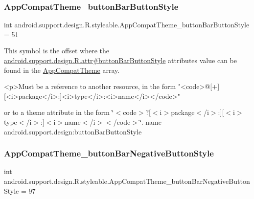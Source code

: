 \subsubsection{\texorpdfstring{App\+Compat\+Theme\+\_\+button\+Bar\+Button\+Style}{AppCompatTheme\_buttonBarButtonStyle}}
{\footnotesize\ttfamily int android.\+support.\+design.\+R.\+styleable.\+App\+Compat\+Theme\+\_\+button\+Bar\+Button\+Style = 51\hspace{0.3cm}{\ttfamily [static]}}

This symbol is the offset where the \hyperlink{classandroid_1_1support_1_1design_1_1R_1_1attr_a209ae9ca1ec9cf4b260524ededf1660c}{android.\+support.\+design.\+R.\+attr\#button\+Bar\+Button\+Style} attribute\textquotesingle{}s value can be found in the \hyperlink{classandroid_1_1support_1_1design_1_1R_1_1styleable_afb351dc8de20cbd4c89abe360373010c}{App\+Compat\+Theme} array.

\begin{DoxyVerb}      <p>Must be a reference to another resource, in the form "<code>@[+][<i>package</i>:]<i>type</i>:<i>name</i></code>"
\end{DoxyVerb}
 or to a theme attribute in the form \char`\"{}$<$code$>$?\mbox{[}$<$i$>$package$<$/i$>$\+:\mbox{]}\mbox{[}$<$i$>$type$<$/i$>$\+:\mbox{]}$<$i$>$name$<$/i$>$$<$/code$>$\char`\"{}.  name android.\+support.\+design\+:button\+Bar\+Button\+Style \mbox{\label{classandroid_1_1support_1_1design_1_1R_1_1styleable_aeede02e7ba2a6ab7672998a15ad32367}} 
\subsubsection{\texorpdfstring{App\+Compat\+Theme\+\_\+button\+Bar\+Negative\+Button\+Style}{AppCompatTheme\_buttonBarNegativeButtonStyle}}
{\footnotesize\ttfamily int android.\+support.\+design.\+R.\+styleable.\+App\+Compat\+Theme\+\_\+button\+Bar\+Negative\+Button\+Style = 97\hspace{0.3cm}{\ttfamily [static]}}

